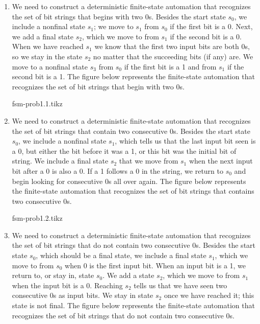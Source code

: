 \documentclass[12pt,class=article,crop=false]{standalone}
\begin{document}
\begin{soln}\hfill
    \begin{enumerate}[label=(\alph*)]
        \item We need to construct a deterministic finite-state automation that recognizes the set of bit strings that begins with two 0s. Besides the start state $ s_0 $, we include a nonfinal state $ s_1 $; we move to $ s_1 $ from $ s_0 $ if the first bit is a 0. Next, we add a final state $ s_2 $, which we move to from $ s_1 $ if the second bit is a 0. When we have reached $ s_1 $ we know that the first two input bits are both 0s, so we stay in the state $ s_2 $ no matter that the succeeding bits (if any) are. We move to a nonfinal state $ s_3 $ from $ s_0 $ if the first bit is a 1 and from $ s_1 $ if the second bit is a 1. The figure below represents the finite-state automation that recognizes the set of bit strings that begin with two 0s.\\
        \begin{minipage}[c]{.9\textwidth}
            \centering
            {fsm-prob1.1.tikz}
        \end{minipage}
        \item We need to construct a deterministic finite-state automation that recognizes the set of bit strings that contain two consecutive 0s. Besides the start state $ s_0 $, we include a nonfinal state $ s_1 $, which tells us that the last input bit seen is a 0, but either the bit before it was a 1, or this bit was the initial bit of string. We include a final state $ s_2 $ that we move from $ s_1 $ when the next input bit after a 0 is also a 0. If a 1 follows a 0 in the string, we return to $ s_0 $ and begin looking for consecutive 0s all over again. The figure below represents the finite-state automation that recognizes the set of bit strings that contains two consecutive 0s.\\
        \begin{minipage}[c]{.9\textwidth}
            \centering
            {fsm-prob1.2.tikz}
        \end{minipage}
        \item We need to construct a deterministic finite-state automation that recognizes the set of bit strings that do not contain two consecutive 0s. Besides the start state $ s_0 $, which should be a final state, we include a final state $ s_1 $, which we move to from $ s_0 $ when 0 is the first input bit. When an input bit is a 1, we return to, or stay in, state $ s_0 $. We add a state $ s_2 $, which we move to from $ s_1 $ when the input bit is a 0. Reaching $ s_2 $ tells us that we have seen two consecutive 0s as input bits. We stay in state $ s_2 $ once we have reached it; this state is not final. The figure below represents the finite-state automation that recognizes the set of bit strings that do not contain two consecutive 0s.\\

\end{enumerate}
\end{soln}
\end{document}
